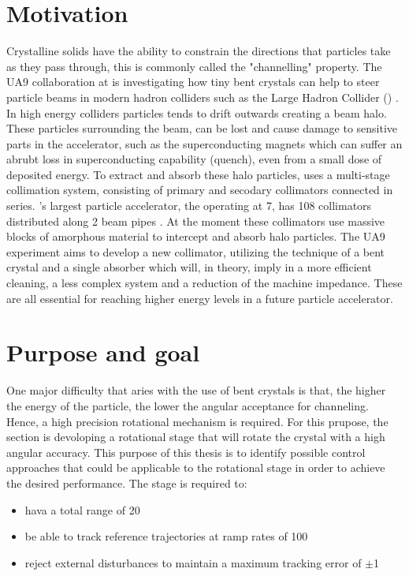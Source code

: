 \section{Motivation}
 Crystalline solids have the ability to constrain the directions that particles take as they pass through, this is commonly called the "channelling" property. The UA9 collaboration at \abbrCERN is investigating how tiny bent crystals can help to steer particle beams in modern hadron colliders such as the Large Hadron Collider (\abbrLHC) \citep{WebsiteUA9:2016}. In high energy colliders particles tends to drift outwards creating a beam halo. These particles surrounding the beam, can be lost and cause damage to sensitive parts in the accelerator, such as the superconducting magnets which can suffer an abrubt loss in superconducting capability (quench), even from a small dose of deposited energy. To extract and absorb these halo particles, \abbrCERN uses a multi-stage collimation system, consisting of primary and secodary collimators connected in series. \abbrCERN's largest particle accelerator, the \abbrLHC operating at \unit{7}{\tera\electronvolt}, has 108 collimators distributed along 2 beam pipes \citep{CrystalCollimation:2015}. At the moment these collimators use massive blocks of amorphous material to intercept and absorb halo particles. The UA9 experiment aims to develop a new collimator, utilizing the technique of a bent crystal and a single absorber which will, in theory, imply in a more efficient cleaning, a less complex system and a reduction of the machine impedance. These are all essential for reaching higher energy levels in a future particle accelerator.


\section{Purpose and goal}
One major difficulty that aries with the use of bent crystals is that, the higher the energy of the particle, the lower the angular acceptance for channeling. Hence, a high precision rotational mechanism is required. For this prupose, the \abbrECE section is devoloping a rotational stage that will rotate the crystal with a high angular accuracy. This purpose of this thesis is to identify possible control approaches that could be applicable to the rotational stage in order to achieve the desired performance. The stage is required to:
\begin{itemize}
  \item hava a total range of \unit{20}{\milli\rad}
  \item be able to track reference trajectories at ramp rates of \unit{100}{\micro\radianpersecond}
  \item reject external disturbances to maintain a maximum tracking error of $\pm$\unit{1}{\micro\rad}
\end{itemize}


